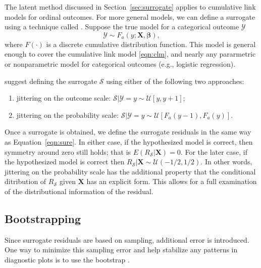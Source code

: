 The latent method discussed in Section~\ref{sec:surrogate} applies to cumulative link models for ordinal outcomes. For more general models, we can define a surrogate using a technique called . Suppose the true model for a categorical outcome $\mathcal{Y}$
\begin{equation}
  \mathcal{Y} \sim F_a\left(y; \boldsymbol{X}, \boldsymbol{\beta}\right),
\end{equation}
where $F\left(\cdot\right)$ is a discrete cumulative distribution function. This model is general enough to cover the cumulative link model \eqref{eqn:clm}, and nearly any pararmetric or nonparametric model for categorical outcomes (e.g., logistic regression).

\citet{residuals-liu-2017} suggest defining the surrogate $\mathcal{S}$ using either of the following two approaches:
\begin{enumerate}
  \item jittering on the outcome scale: $\mathcal{S} | \mathcal{Y} = y \sim \mathcal{U}\left[y, y + 1\right]$;
  \item jittering on the probability scale: $\mathcal{S} | \mathcal{Y} = y \sim \mathcal{U}\left[F_a\left(y - 1\right), F_a\left(y\right)\right]$.
\end{enumerate}
Once a surrogate is obtained, we define the surrogate residuals in the same way as Equation~\ref{eqn:sure}.
In either case, if the hypothesized model is correct, then symmetry around zero still holds; that is $E\left(R_\mathcal{S} | \boldsymbol{X}\right) = 0$. For the later case, if the hypothesized model is correct then $R_\mathcal{S} | \boldsymbol{X} \sim \mathcal{U}\left(-1/2, 1/2\right)$. In other words, jittering on the probability scale has the additional property that the conditional ditribution of $R_\mathcal{S}$ given $\boldsymbol{X}$ has an explicit form. This allows for a full examination of the distributional information of the residual.


\subsection{Bootstrapping}

Since surrogate residuals are based on sampling, additional error is introduced. One way to minimize this sampling error and help stabilize any patterns in diagnostic plots is to use the bootstrap \citep{efron-another-1979}.

